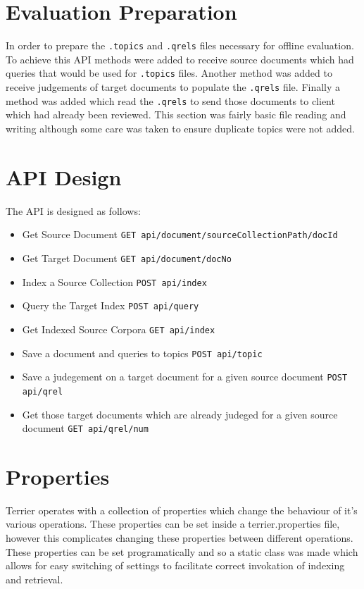 \documentclass{l4proj}
\newcommand{\code}[1]{\texttt{#1}}
\begin{document}
\section{Evaluation Preparation}
In order to prepare the \code{.topics} and \code{.qrels} files necessary for offline evaluation.
To achieve this API methods were added to receive source documents which had queries that would be used for \code{.topics} files. Another method was added to receive judgements of target documents to populate the \code{.qrels} file. Finally a method was added which read the \code{.qrels} to send those documents to client which had already been reviewed.
This section was fairly basic file reading and writing although some care was taken to ensure duplicate topics were not added.

\section{API Design}
The API is designed as follows:
\begin{itemize}
\item Get Source Document
\code{GET api/document/{sourceCollectionPath}/{docId}}
\item Get Target Document
\code{GET api/document/{docNo}}
\item Index a Source Collection
\code{POST api/index}
\item Query the Target Index
\code{POST api/query}
\item Get Indexed Source Corpora
\code{GET api/index}
\item Save a document and queries to topics
\code{POST api/topic}
\item Save a judegement on a target document for a given source document
\code{POST api/qrel}
\item Get those target documents which are already judeged for a given source document
\code{GET api/qrel/{num}}
\end{itemize}

\section{Properties}
Terrier operates with a collection of properties which change the behaviour of it's various operations. These properties can be set inside a terrier.properties file, however this complicates changing these properties between different operations. These properties can be set programatically and so a static class was made which allows for easy switching of settings to facilitate correct invokation of indexing and retrieval.
\end{document}
